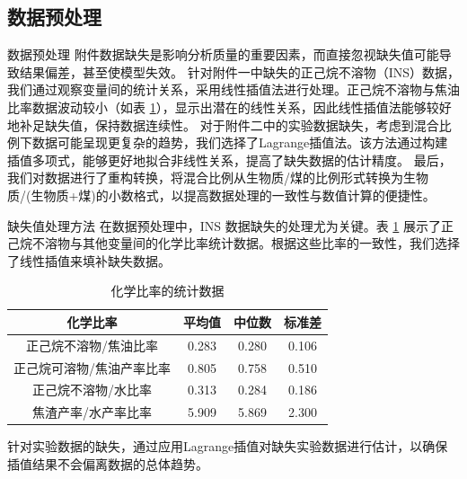 \documentclass{beamer}
\begin{document}
\subsection{数据预处理}
\begin{frame}{数据预处理}
    \justifying
    \alert{附件数据缺失}是影响分析质量的重要因素，而直接忽视缺失值可能导致结果偏差，甚至使模型失效。
    \vspace{0.25cm}
    针对附件一中缺失的正己烷不溶物（INS）数据，我们通过观察变量间的统计关系，采用\alert{线性插值法}进行处理。正己烷不溶物与焦油比率数据波动较小（如表 \ref{tab:chemical_ratios}），显示出潜在的线性关系，因此线性插值法能够较好地补足缺失值，保持数据连续性。
    \vspace{0.25cm}
    对于附件二中的实验数据缺失，考虑到混合比例下数据可能呈现更复杂的趋势，我们选择了\alert{Lagrange插值法}。该方法通过构建插值多项式，能够更好地拟合非线性关系，提高了缺失数据的估计精度。
    \vspace{0.25cm}    
    最后，我们对数据进行了重构转换，将混合比例从生物质/煤的比例形式转换为\alert{生物质/(生物质+煤)}的小数格式，以提高数据处理的一致性与\alert{数值计算}的便捷性。
\end{frame}

\begin{frame}{缺失值处理方法}
    \justifying
    在数据预处理中，INS 数据缺失的处理尤为关键。表 \ref{tab:chemical_ratios} 展示了正己烷不溶物与其他变量间的化学比率统计数据。根据这些比率的一致性，我们选择了线性插值来填补缺失数据。
    
    \vspace{0.1cm}
    \begin{table}[htbp]
    \centering
    \caption{化学比率的统计数据}
    \begin{tabular}{cccc}
    \hline
    \textbf{化学比率} & \textbf{平均值} & \textbf{中位数} & \textbf{标准差} \\
    \hline
    正己烷不溶物/焦油比率 & 0.283 & 0.280 & 0.106 \\
    正己烷可溶物/焦油产率比率 & 0.805 & 0.758 & 0.510 \\
    正己烷不溶物/水比率 & 0.313 & 0.284 & 0.186 \\
    焦渣产率/水产率比率 & 5.909 & 5.869 & 2.300 \\
    \hline
    \end{tabular}
    \label{tab:chemical_ratios}
    \end{table}
    
    针对实验数据的缺失，通过应用Lagrange插值对缺失实验数据进行估计，以确保插值结果不会偏离数据的总体趋势。
\end{frame}
\end{document}
